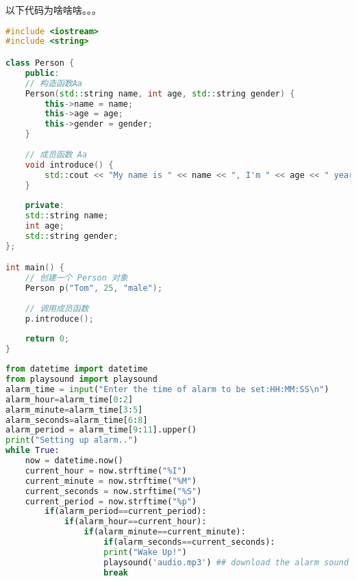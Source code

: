 \begin{center}
\end{center}

以下代码为啥啥啥。。。

\begin{lstlisting}[language=C++]
#include <iostream>
#include <string>

class Person {
	public:
	// 构造函数Aa
	Person(std::string name, int age, std::string gender) {
		this->name = name;
		this->age = age;
		this->gender = gender;
	}
	
	// 成员函数 Aa
	void introduce() {
		std::cout << "My name is " << name << ", I'm " << age << " years old, and I'm a " << gender << "." << std::endl;
	}
	
	private:
	std::string name;
	int age;
	std::string gender;
};

int main() {
	// 创建一个 Person 对象
	Person p("Tom", 25, "male");
	
	// 调用成员函数
	p.introduce();
	
	return 0;
}

\end{lstlisting}


\begin{lstlisting}[language=python]
from datetime import datetime   
from playsound import playsound
alarm_time = input("Enter the time of alarm to be set:HH:MM:SS\n")
alarm_hour=alarm_time[0:2]
alarm_minute=alarm_time[3:5]
alarm_seconds=alarm_time[6:8]
alarm_period = alarm_time[9:11].upper()
print("Setting up alarm..")
while True:
	now = datetime.now()
	current_hour = now.strftime("%I")
	current_minute = now.strftime("%M")
	current_seconds = now.strftime("%S")
	current_period = now.strftime("%p")
		if(alarm_period==current_period):
			if(alarm_hour==current_hour):
				if(alarm_minute==current_minute):
					if(alarm_seconds==current_seconds):
					print("Wake Up!")
					playsound('audio.mp3') ## download the alarm sound from link
					break

\end{lstlisting}

